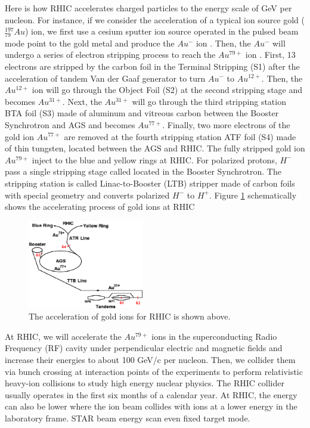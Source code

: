 Here is how RHIC accelerates charged particles to the energy scale of GeV per nucleon. For instance, if we consider the acceleration of a typical ion source gold (${}^{197}_{79}Au$) ion, we first use a cesium sputter ion source operated in the pulsed beam mode point to the gold metal and produce the $Au^-$ ion \cite{FirstAuSource}. Then, the $Au^{-}$ will undergo a series of electron stripping process to reach the $Au^{79+}$ ion \cite{RHICStrpDetail}. First, 13 electrons are stripped by the carbon foil in the Terminal Stripping (S1) after the acceleration of tandem Van der Gaaf generator to turn $Au^{-}$ to $Au^{12+}$. Then, the $Au^{12+}$ ion will go through the Object Foil (S2) at the second stripping stage and becomes $Au^{31+}$. Next, the $Au^{31+}$ will go through the third stripping station BTA foil (S3) made of aluminum and vitreous carbon between the Booster Synchrotron and AGS and becomes $Au^{77+}$. Finally, two more electrons of the gold ion $Au^{77+}$ are removed at the fourth stripping station ATF foil (S4) made of thin tungsten, located between the AGS and RHIC. The fully stripped gold ion $Au^{79+}$ inject to the blue and yellow rings at RHIC. For polarized protons, $H^-$ pass a single stripping stage called located in the Booster Synchrotron. The stripping station is called Linac-to-Booster (LTB) stripper made of carbon foils with special geometry and converts polarized $H^-$ to $H^+$. Figure \ref{AccAu} schematically shows the accelerating process of gold ions at RHIC \cite{AuStripRef}

\begin{figure}[hbtp]
\begin{center}
\includegraphics[width=0.45\textwidth]{Figures/Chapter1/AccAu.png}
\caption{The acceleration of gold ions for RHIC is shown above.}
\label{AccAu}
\end{center}
\end{figure} 

At RHIC, we will accelerate the $Au^{79+}$ ions in the superconducting Radio Frequency (RF) cavity under perpendicular electric and magnetic fields and increase their energies to about 100 GeV/c per nucleon. Then, we collider them via bunch crossing at interaction points of the experiments to perform relativistic heavy-ion collisions to study high energy nuclear physics. The RHIC collider usually operates in the first six months of a calendar year. At RHIC, the energy can also be lower where the ion beam collides with ions at a lower energy in the laboratory frame. STAR beam energy scan even fixed target mode. 

